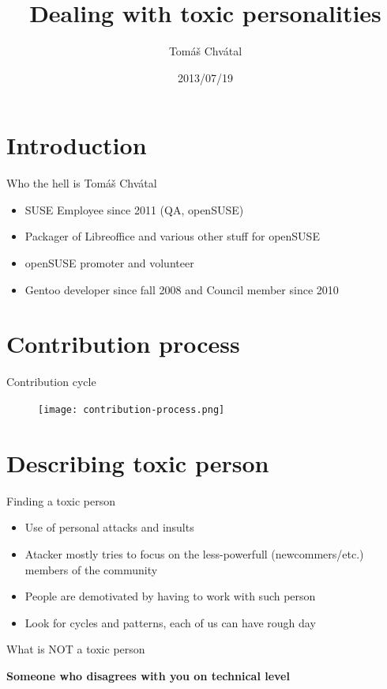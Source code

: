\documentclass{beamer}
\author{Tom\'{a}\v{s} Chv\'{a}tal\newline {\small openSUSE Team}}
\title{Dealing with toxic personalities}
\date{2013/07/19}
\begin{document}
\begin{frame}[t,plain]
\titlepage
\end{frame}

\section{Introduction}

\begin{frame}[t]{Who the hell is Tomáš Chvátal}
	\begin{itemize}
	\item SUSE Employee since 2011 (QA, openSUSE)
	\item Packager of Libreoffice and various other stuff for openSUSE
	\item openSUSE promoter and volunteer
	\item Gentoo developer since fall 2008 and Council member since 2010
	\end{itemize}
\end{frame}

\section{Contribution process}

\begin{frame}{Contribution cycle}
	\begin{figure}
	\texttt{[image: contribution-process.png]}
	\end{figure}
\end{frame}

\section{Describing toxic person}

\begin{frame}[t]{Finding a toxic person}
	\begin{itemize}
	\item Use of personal attacks and insults
	\item Atacker mostly tries to focus on the less-powerfull (newcommers/etc.) members of the community
	\item People are demotivated by having to work with such person
	\item Look for cycles and patterns, each of us can have rough day
	\end{itemize}
\end{frame}

\begin{frame}{What is NOT a toxic person}
	\begin{center}
	\textbf{Someone who disagrees with you on technical level}
	\end{center}
\end{frame}
\end{document}
